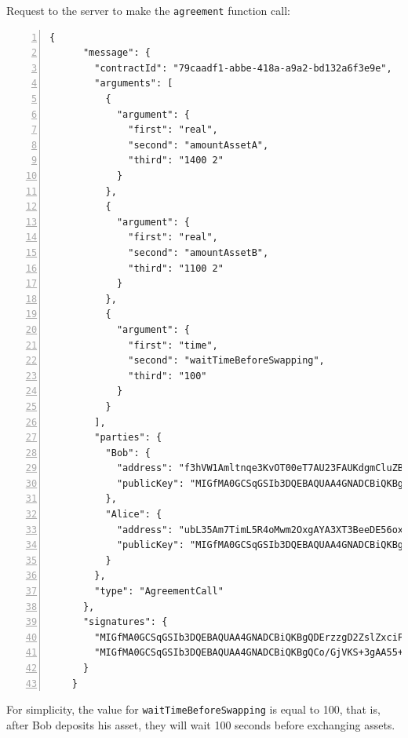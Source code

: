 Request to the server to make the \verb|agreement| function call:
{
  \small
  \begin{Verbatim}[numbers=left,xleftmargin=1cm,firstnumber=1,breaklines=true,breakanywhere=true,tabsize=2]
    {
      "message": {
        "contractId": "79caadf1-abbe-418a-a9a2-bd132a6f3e9e",
        "arguments": [
          {
            "argument": {
              "first": "real",
              "second": "amountAssetA",
              "third": "1400 2"
            }
          },
          {
            "argument": {
              "first": "real",
              "second": "amountAssetB",
              "third": "1100 2"
            }
          },
          {
            "argument": {
              "first": "time",
              "second": "waitTimeBeforeSwapping",
              "third": "100"
            }
          }
        ],
        "parties": {
          "Bob": {
            "address": "f3hVW1Amltnqe3KvOT00eT7AU23FAUKdgmCluZB+nss=",
            "publicKey": "MIGfMA0GCSqGSIb3DQEBAQUAA4GNADCBiQKBgQDErzzgD2ZslZxciFAiX3/ot7lrkZDw4148jFZrsDZPE6CVs9xXFSHGgy/mFvIFLXhnChO6Nyd2be3lbgeavLMCMVUiTStXr117Km17keWpb3sItkKKsLFBOcIIU8XXowI/OhzQN2XPZYESHgjdQ5vwEj2YyueiS7WKP94YWz/pswIDAQAB"
          },
          "Alice": {
            "address": "ubL35Am7TimL5R4oMwm2OxgAYA3XT3BeeDE56oxqdLc=",
            "publicKey": "MIGfMA0GCSqGSIb3DQEBAQUAA4GNADCBiQKBgQCo/GjVKS+3gAA55+kko41yINdOcCLQMSBQyuTTkKHE1mhu/TgOpivM0wLPsSga8hQMr3+v3aR0IF/vfCRf6SdiXmWx/jflmEXtnT6fkGcnV6dGNUpHWXSpwUIDt0N88jfnEqekx4S+KDCKg99sGEeHeT65fKS8lB0gjHMt9AOriwIDAQAB"
          }
        },
        "type": "AgreementCall"
      },
      "signatures": {
        "MIGfMA0GCSqGSIb3DQEBAQUAA4GNADCBiQKBgQDErzzgD2ZslZxciFAiX3/ot7lrkZDw4148jFZrsDZPE6CVs9xXFSHGgy/mFvIFLXhnChO6Nyd2be3lbgeavLMCMVUiTStXr117Km17keWpb3sItkKKsLFBOcIIU8XXowI/OhzQN2XPZYESHgjdQ5vwEj2YyueiS7WKP94YWz/pswIDAQAB": "Wrqyz5udZAGarLbSlxhYD+Ur6+EqTCFiwqBHEL2IsO5Y23Yxv14O3UzknrwK41L5LPUgVxR3K75AAZ4n+UcUdDNHlm9KHN7rqpsbe7v3yK2q8Qkk6c4IYNPDRFy3Zw62HH94O7tx8CzcvRfdX4fi+RItf4Fa7hb8Ui/crxDEQN8=",
        "MIGfMA0GCSqGSIb3DQEBAQUAA4GNADCBiQKBgQCo/GjVKS+3gAA55+kko41yINdOcCLQMSBQyuTTkKHE1mhu/TgOpivM0wLPsSga8hQMr3+v3aR0IF/vfCRf6SdiXmWx/jflmEXtnT6fkGcnV6dGNUpHWXSpwUIDt0N88jfnEqekx4S+KDCKg99sGEeHeT65fKS8lB0gjHMt9AOriwIDAQAB": "o/bdsudfHdR4BBd9EVaGYikksIezSEdwhHELH/f7xRD9g4uokO5g8wHph6LOht5dt9Y+dYt+Qrt+zNZzGUP8a50R7WB2gNz0Jn3zndKnVoBVhsda/zEwIA2pqccP2Sda7zCYiFTfgnmlUZZZfxjtLazBUzDE/vVVFcwtXAHYMXk="
      }
    }
  \end{Verbatim}
}

For simplicity, the value for \verb|waitTimeBeforeSwapping| is equal to 100, that is, after Bob deposits 
his asset, they will wait 100 seconds before exchanging assets.

